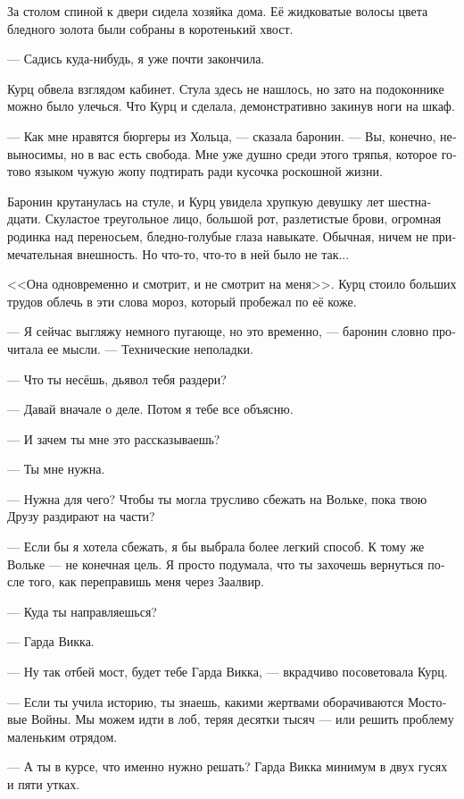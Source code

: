 \documentclass[a4paper,12pt,fleqn]{book}\usepackage{cooltooltips}\usepackage{polyglossia}\setdefaultlanguage[babelshorthands=true]{russian}\setotherlanguage{english}\defaultfontfeatures{Ligatures=TeX,Mapping=tex-text} \usepackage{xcolor}\definecolor{lightgray}{HTML}{bbbbbb}\color{lightgray}\newcommand{\ml}[3]{\textenglish{\textcolor{black}{#3}}}
\newcommand{\asterism}{\vspace{1em}{\centering\Large\bfseries$\ast~\ast~\ast$\par}\vspace{1em}}
\begin{document}
За столом спиной к двери сидела хозяйка дома.
Её жидковатые волосы цвета бледного золота были собраны в коротенький хвост.

--- Садись куда-нибудь, я уже почти закончила.

Курц обвела взглядом кабинет.
Стула здесь не нашлось, но зато на подоконнике можно было улечься.
Что Курц и сделала, демонстративно закинув ноги на шкаф.

--- Как мне нравятся бюргеры из Хольца, --- сказала баронин.
--- Вы, конечно, невыносимы, но в вас есть свобода.
Мне уже душно среди этого тряпья, которое готово языком чужую жопу подтирать ради кусочка роскошной жизни.

Баронин крутанулась на стуле, и Курц увидела хрупкую девушку лет шестнадцати.
Скуластое треугольное лицо, большой рот, разлетистые брови, огромная родинка над переносьем, бледно-голубые глаза навыкате.
Обычная, ничем не примечательная внешность.
Но что-то, что-то в ней было не так...

<<Она одновременно и смотрит, и не смотрит на меня>>.
Курц стоило больших трудов облечь в эти слова мороз, который пробежал по её коже.

--- Я сейчас выгляжу немного пугающе, но это временно, --- баронин словно прочитала ее мысли.
--- Технические неполадки.

--- Что ты несёшь, дьявол тебя раздери?

--- Давай вначале о деле.
Потом я тебе все объясню.

\asterism

--- И зачем ты мне это рассказываешь?

--- Ты мне нужна.

--- Нужна для чего?
Чтобы ты могла трусливо сбежать на Вольке, пока твою Друзу раздирают на части?

--- Если бы я хотела сбежать, я бы выбрала более легкий способ.
К тому же Вольке --- не конечная цель.
Я просто подумала, что ты захочешь вернуться после того, как переправишь меня через Заалвир.

--- Куда ты направляешься?

--- Гарда Викка.

--- Ну так отбей мост, будет тебе Гарда Викка, --- вкрадчиво посоветовала Курц.

--- Если ты учила историю, ты знаешь, какими жертвами оборачиваются Мостовые Войны.
Мы можем идти в лоб, теряя десятки тысяч --- или решить проблему маленьким отрядом.

--- А ты в курсе, что именно нужно решать?
Гарда Викка минимум в двух гусях и пяти утках.
\end{document}

